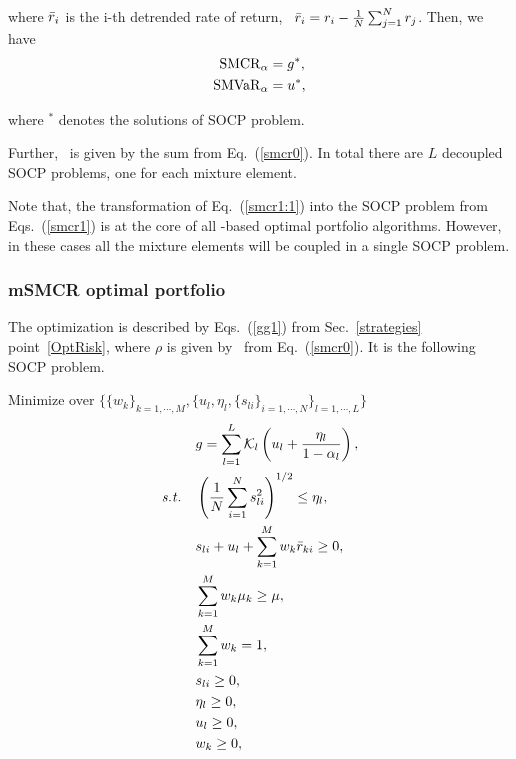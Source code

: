 \noindent where ${\bar r}_i$ is the i-th detrended rate of return, \ie\ ${\bar r}_i = r_i - \frac{1}{N}\sum_{j=1}^N r_j$.
Then, we have
\begin{subequations}\label{smcr2}
\begin{align}
    \SMCR_\alpha &= g^*, \label{smcr2a} \\
    \SMVaR_\alpha & = u^*, \label{smcr2b}
\end{align}
\end{subequations}

\noindent where $^*$ denotes the solutions of SOCP problem.

Further, \mSMCR\ is given by the sum from Eq.~(\ref{smcr0}).
In total there are $L$ decoupled SOCP problems, one for each mixture element.

Note that, the transformation of Eq.~(\ref{smcr1:1}) into the SOCP problem from Eqs.~(\ref{smcr1})
is at the core of all \mSMCR-based optimal portfolio algorithms. However, in these cases all the mixture elements
will be coupled in a single SOCP problem.

\BackToContents

\subsubsection{mSMCR optimal portfolio}
The optimization is described by Eqs.~(\ref{gg1}) from Sec.~\ref{strategies} point~\ref{OptRisk},
where $\rho$ is given by \mSMCR\ from Eq.~(\ref{smcr0}).
It is the following SOCP problem.

\bigskip
\noindent Minimize over $\{ \{w_k\}_{k=1,\cdots,M}, \{ u_l, \eta_l, \{s_{li}\}_{i=1,\cdots,N} \}_{l=1,\cdots,L}\}$
\begin{subequations}\label{smcr3}
\begin{align}
    &g = \sum_{l=1}^L \cK_l \left( u_l + \frac{\eta_l}{1 - \alpha_l}  \right), \label{smcr3a} \\
    \st &\left( \frac{1}{N}  \sum_{i=1}^N s_{li}^2 \right)^{1/2} \leq \eta_l, \label{smcr3b} \\
        &s_{li} + u_l + \sum_{k=1}^M w_k \br_{ki} \geq 0, \label{smcr3c} \\
        &\sum_{k=1}^M w_k \mu_k \geq \mu, \label{smcr3d} \\
        &\sum_{k=1}^M w_k = 1, \label{smcr3e} \\
        &s_{li} \geq 0, \label{smcr3f} \\
        &\eta_l \geq 0, \label{smcr3h} \\
        &u_l \geq 0, \label{smcr3i} \\
        &w_k \geq 0, \label{smcr3g}
\end{align}
\end{subequations}

